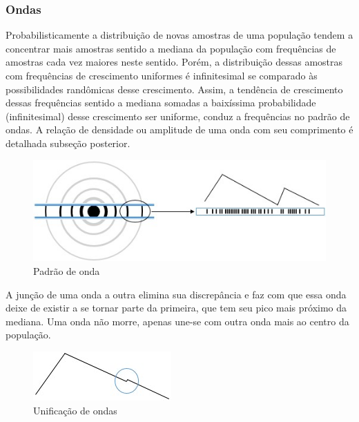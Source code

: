 \subsubsection{Ondas}
Probabilisticamente a distribuição de novas amostras de uma população tendem a concentrar mais amostras sentido a mediana da população com frequências de amostras cada vez maiores neste sentido. Porém, a distribuição dessas amostras com frequências de crescimento uniformes é infinitesimal se comparado às possibilidades randômicas desse crescimento. Assim, a tendência de crescimento dessas frequências sentido a mediana somadas a baixíssima probabilidade (infinitesimal) desse crescimento ser uniforme, conduz a frequências no padrão de ondas. A relação de densidade ou amplitude de uma onda com seu comprimento é detalhada subseção posterior.
	\begin{figure}[H]
	\caption{Padrão de onda}
	\label{fig:consciousness_waves}
	\centering
	\includegraphics[scale=.8]{sections/images/consciousness_waves.jpg}
	\end{figure}

A junção de uma onda a outra elimina sua discrepância e faz com que essa onda deixe de existir a se tornar parte da primeira, que tem seu pico mais próximo da mediana. Uma onda não morre, apenas une-se com outra onda mais ao centro da população.
	\begin{figure}[H]
	\caption{Unificação de ondas}
	\label{fig:consciousness_uniform_wave}
	\centering
	\includegraphics[scale=1]{sections/images/consciousness_uniform_wave.jpg}
	\end{figure}

